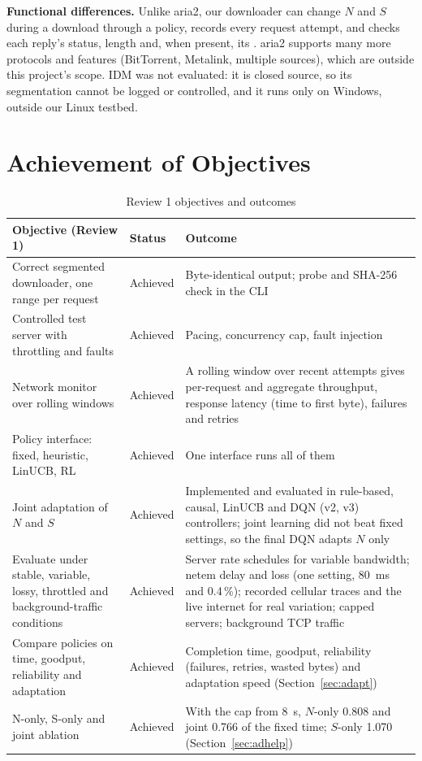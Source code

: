 \textbf{Functional differences.} Unlike aria2, our downloader can change $N$ and $S$ during a download through a policy, records every request attempt, and checks each reply's status, length and, when present, its . aria2 supports many more protocols and features (BitTorrent, Metalink, multiple sources), which are outside this project's scope. IDM was not evaluated: it is closed source, so its segmentation cannot be logged or controlled, and it runs only on Windows, outside our Linux testbed.

\chapter{Achievement of Objectives}
\begin{table}[H]\centering
\caption{Review 1 objectives and outcomes}\label{tab:objectives}
\begin{tabularx}{\linewidth}{@{}P{5.3cm}P{1.7cm}L@{}}
\toprule
\textbf{Objective (Review 1)} & \textbf{Status} & \textbf{Outcome}\\
\midrule
Correct segmented downloader, one range per request & Achieved & Byte-identical output; probe and SHA-256 check in the CLI\\
Controlled test server with throttling and faults & Achieved & Pacing, concurrency cap, fault injection\\
Network monitor over rolling windows & Achieved & A rolling window over recent attempts gives per-request and aggregate throughput, response latency (time to first byte), failures and retries\\
Policy interface: fixed, heuristic, LinUCB, RL & Achieved & One interface runs all of them\\
Joint adaptation of $N$ and $S$ & Achieved & Implemented and evaluated in rule-based, causal, LinUCB and DQN (v2, v3) controllers; joint learning did not beat fixed settings, so the final DQN adapts $N$ only\\
Evaluate under stable, variable, lossy, throttled and background-traffic conditions & Achieved & Server rate schedules for variable bandwidth; netem delay and loss (one setting, 80~ms and 0.4\,\%); recorded cellular traces and the live internet for real variation; capped servers; background TCP traffic\\
Compare policies on time, goodput, reliability and adaptation & Achieved & Completion time, goodput, reliability (failures, retries, wasted bytes) and adaptation speed (Section~\ref{sec:adapt})\\
N-only, S-only and joint ablation & Achieved & With the cap from 8~s, $N$-only 0.808 and joint 0.766 of the fixed time; $S$-only 1.070 (Section~\ref{sec:adhelp})\\
\bottomrule
\end{tabularx}
\end{table}

